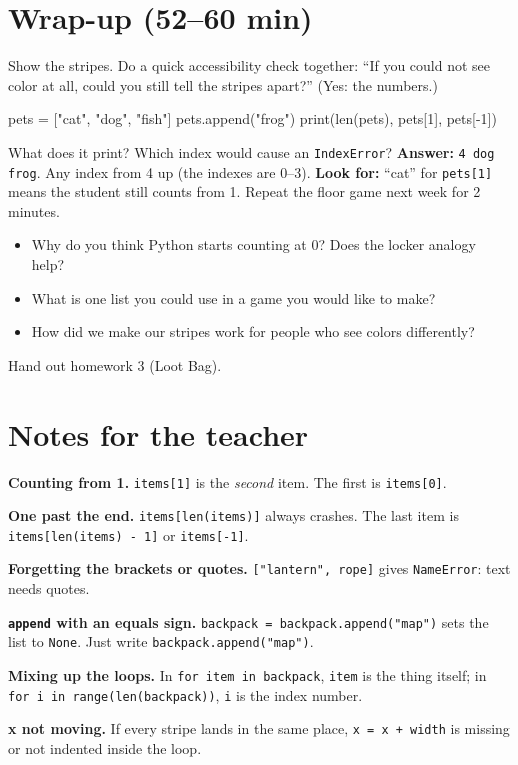 \section{Wrap-up (52--60 min)}
Show the stripes. Do a quick accessibility check together: \enquote{If you could not see color at all, could you still tell the stripes apart?}
(Yes: the numbers.)

\begin{formativecheck}
\begin{pycode}
pets = ["cat", "dog", "fish"]
pets.append("frog")
print(len(pets), pets[1], pets[-1])
\end{pycode}
What does it print? Which index would cause an \texttt{IndexError}?
\textbf{Answer:} \texttt{4 dog frog}. Any index from 4 up (the indexes are 0--3).
\textbf{Look for:} \enquote{cat} for \texttt{pets[1]} means the student still counts from 1. Repeat the floor game next week for 2 minutes.
\end{formativecheck}

\begin{reflection}
\begin{itemize}[leftmargin=1.2em]
  \item Why do you think Python starts counting at 0? Does the locker analogy help?
  \item What is one list you could use in a game you would like to make?
  \item How did we make our stripes work for people who see colors differently?
\end{itemize}
\end{reflection}
Hand out homework 3 (Loot Bag).

\section{Notes for the teacher}
\begin{commonmistakes}
  \item \textbf{Counting from 1.} \texttt{items[1]} is the \emph{second} item. The first is \texttt{items[0]}.
  \item \textbf{One past the end.} \texttt{items[len(items)]} always crashes. The last item is \texttt{items[len(items) - 1]} or \texttt{items[-1]}.
  \item \textbf{Forgetting the brackets or quotes.} \texttt{["lantern", rope]} gives \texttt{NameError}: text needs quotes.
  \item \textbf{\texttt{append} with an equals sign.} \texttt{backpack = backpack.append("map")} sets the list to \texttt{None}. Just write \texttt{backpack.append("map")}.
  \item \textbf{Mixing up the loops.} In \texttt{for item in backpack}, \texttt{item} is the thing itself; in \texttt{for i in range(len(backpack))}, \texttt{i} is the index number.
  \item \textbf{x not moving.} If every stripe lands in the same place, \texttt{x = x + width} is missing or not indented inside the loop.
\end{commonmistakes}

